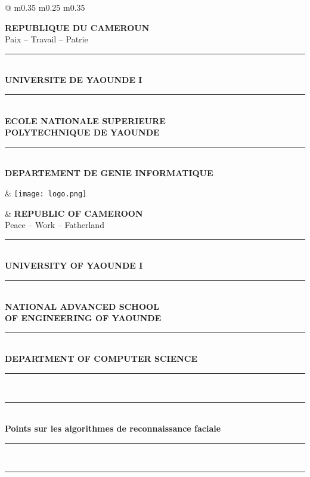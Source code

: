 \documentclass[11pt,a4paper]{article}
\newcommand{\HRule}{\rule{\linewidth}{1pt}}
\newcommand{\DoubleHRule}{\rule{\linewidth}{1.5pt}\\[-0.3em]\rule{\linewidth}{0.8pt}}
\begin{document}
	\thispagestyle{empty} %
	
	\begin{tcolorbox}[
		colback=blue!5,
		colframe=blue!50,
		boxrule=0.8pt,
		arc=4mm,
		left=4mm, right=4mm, top=2mm, bottom=2mm
		]
		
		\begin{tabular*}{\textwidth}{@{\extracolsep{\fill}} m{0.35\textwidth} m{0.25\textwidth} m{0.35\textwidth} }
			
			\centering
			\textbf{REPUBLIQUE DU CAMEROUN}\\
			Paix -- Travail -- Patrie\\
			\HRule \\[0.3em]
			\textbf{UNIVERSITE DE YAOUNDE I}\\
			\HRule \\[0.3em]
			\textbf{ECOLE NATIONALE SUPERIEURE\\POLYTECHNIQUE DE YAOUNDE}\\
			\HRule \\[0.3em]
			\textbf{DEPARTEMENT DE GENIE INFORMATIQUE}
			
			&
			\centering
			\texttt{[image: logo.png]}
			
			&
			\centering
			\textbf{REPUBLIC OF CAMEROON}\\
			Peace -- Work -- Fatherland\\
			\HRule \\[0.3em]
			\textbf{UNIVERSITY OF YAOUNDE I}\\
			\HRule \\[0.3em]
			\textbf{NATIONAL ADVANCED SCHOOL\\OF ENGINEERING OF YAOUNDE}\\
			\HRule \\[0.3em]
			\textbf{DEPARTMENT OF COMPUTER SCIENCE}
			
		\end{tabular*}
	\end{tcolorbox}
	
	\vspace{1.2cm}
	
	\begin{center}
		\DoubleHRule \\[1em]
		{\huge \bfseries Points sur les algorithmes de reconnaissance faciale }\\[1em]
		\DoubleHRule
	\end{center}
	
\end{document}
